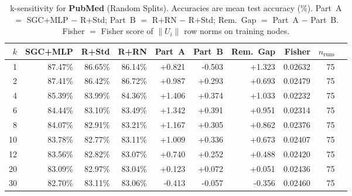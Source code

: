 \begin{table}[t]
\centering\small\setlength{\tabcolsep}{5pt}
\caption{k-sensitivity for \textbf{PubMed} (Random Splits). Accuracies are mean test accuracy (\%). Part~A $=$ SGC+MLP $-$ R+Std; Part~B $=$ R+RN $-$ R+Std; Rem.~Gap $=$ Part~A $-$ Part~B. Fisher $=$ Fisher score of $\|U_i\|$ row norms on training nodes.}
\label{tab:exp8_per_dataset_pubmed_random}
\begin{tabular}{rrrrrrrrrr}
\toprule
$k$ & SGC+MLP & R+Std & R+RN & Part~A & Part~B & Rem.~Gap & Fisher & $n_{\mathrm{runs}}$ \\
\midrule
1 & 87.47\% & 86.65\% & 86.14\% & +0.821 & -0.503 & +1.323 & 0.02632 & 75 \\
2 & 87.41\% & 86.42\% & 86.72\% & +0.987 & +0.293 & +0.693 & 0.02479 & 75 \\
4 & 85.39\% & 83.99\% & 84.36\% & +1.406 & +0.374 & +1.033 & 0.02232 & 75 \\
6 & 84.44\% & 83.10\% & 83.49\% & +1.342 & +0.391 & +0.951 & 0.02314 & 75 \\
8 & 84.07\% & 82.91\% & 83.21\% & +1.167 & +0.305 & +0.862 & 0.02376 & 75 \\
10 & 83.78\% & 82.77\% & 83.11\% & +1.009 & +0.336 & +0.673 & 0.02407 & 75 \\
12 & 83.56\% & 82.82\% & 83.07\% & +0.740 & +0.252 & +0.488 & 0.02420 & 75 \\
20 & 83.09\% & 82.97\% & 83.04\% & +0.123 & +0.072 & +0.051 & 0.02436 & 75 \\
30 & 82.70\% & 83.11\% & 83.06\% & -0.413 & -0.057 & -0.356 & 0.02460 & 75 \\
\bottomrule
\end{tabular}
\end{table}
